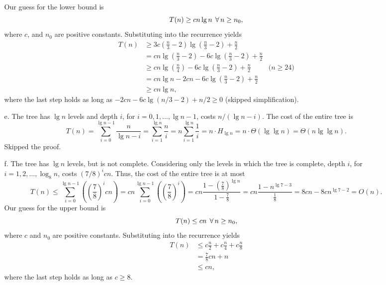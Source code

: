 \begin{enumerate}
\begin{framed}
\begin{enumerate}
      Our guess for the lower bound is
      \[
      T(n) \ge c n \lg n \; \operatorname{\forall} n \ge n_0,
      \]
      where $c$, and $n_0$ are positive constants. Substituting into the recurrence
      yields
      \begin{equation*}
      \begin{aligned}
        T(n) &\ge 3c \left(\frac{n}{3} - 2\right) \lg \left(\frac{n}{3} - 2\right) + \frac{n}{2}\\
             &=   c n \lg \left(\frac{n}{3} - 2\right) - 6c \lg \left(\frac{n}{3} - 2\right) + \frac{n}{2}\\
             &\ge cn \lg \left(\frac{n}{4}\right) - 6c \lg \left(\frac{n}{3} - 2\right) + \frac{n}{2} & \text{($n \ge 24$)}\\
             &=   cn \lg n - 2cn - 6c \lg \left(\frac{n}{3} - 2\right) + \frac{n}{2}\\
             &\ge cn \lg n,
      \end{aligned}
      \end{equation*}
      where the last step holds as long as $-2cn - 6c \lg (n/3 - 2) + n/2 \ge 0$
      (skipped simplification).
    \item[e.] The tree has $\lg n$ levels and depth $i$, for $i = 0, 1,
      \dots, \lg n - 1$, costs $n/(\lg n - i)$. The cost of the entire
      tree is
      \[
        T(n) = \sum_{i = 0}^{\lg n - 1} \frac{n}{\lg n - i}
             = \sum_{i = 1}^{\lg n} \frac{n}{i}
             = n \sum_{i = 1}^{\lg n} \frac{1}{i}
             = n \cdot H_{\lg n}
             = n \cdot \Theta(\lg \lg n)
             = \Theta(n \lg \lg n).
      \]
      Skipped the proof.
    \item[f.] The tree has $\lg n$ levels, but is not complete. Considering
      only the levels in which the tree is complete, depth $i$, for
      $i = 1, 2, \dots, \log_8 n$, costs $(7/8)^i cn$. Thus, the cost of the
      entire tree is at most
      \[
        T(n) \le \sum_{i=0}^{\lg n - 1} \left( \left(\frac{7}{8}\right)^i cn \right)
             = cn \sum_{i=0}^{\lg n - 1} \left( \left(\frac{7}{8}\right)^i \right)
             = cn \frac{1 - \left(\frac{7}{8}\right)^{\lg n}}{1 - \frac{7}{8}}
             = cn \frac{1 - n^{\lg 7 - 3}}{\frac{1}{8}}
             = 8cn - 8cn^{\lg 7 - 2}
             = O(n).
      \]
      Our guess for the upper bound is
      \[
      T(n) \le c n \; \operatorname{\forall} n \ge n_0,
      \]
      where $c$ and $n_0$ are positive constants. Substituting into the recurrence
      yields
      \begin{equation*}
      \begin{aligned}
        T(n) &\le c \frac{n}{2} + c \frac{n}{4} + c \frac{n}{8}\\
             &= \frac{7}{8} cn + n\\
             &\le cn,
      \end{aligned}
      \end{equation*}
      where the last step holds as long as $c \ge 8$.


\end{enumerate}
\end{framed}
\end{enumerate}
